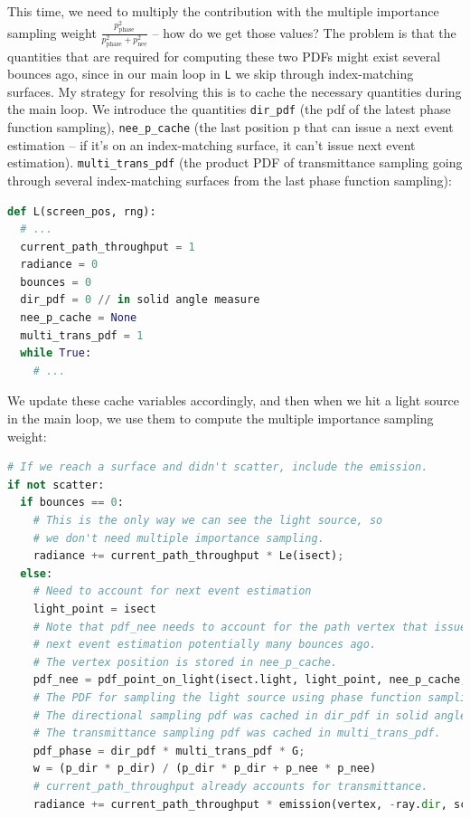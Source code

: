 This time, we need to multiply the contribution with the multiple importance sampling weight $\frac{p_{\text{phase}}^2}{p_{\text{phase}}^2 + p_{\text{nee}}^2}$ -- how do we get those values? The problem is that the quantities that are required for computing these two PDFs might exist several bounces ago, since in our main loop in \lstinline{L} we skip through index-matching surfaces. My strategy for resolving this is to cache the necessary quantities during the main loop. We introduce the quantities \lstinline{dir_pdf} (the pdf of the latest phase function sampling), \lstinline{nee_p_cache} (the last position p that can issue a next event estimation -- if it's on an index-matching surface, it can't issue next event estimation). \lstinline{multi_trans_pdf} (the product PDF of transmittance sampling going through several index-matching surfaces from the last phase function sampling):
\begin{lstlisting}[language=python]
def L(screen_pos, rng):
  # ...
  current_path_throughput = 1
  radiance = 0
  bounces = 0
  dir_pdf = 0 // in solid angle measure
  nee_p_cache = None
  multi_trans_pdf = 1
  while True:
    # ...
\end{lstlisting}

We update these cache variables accordingly, and then when we hit a light source in the main loop, we use them to
compute the multiple importance sampling weight:
\begin{lstlisting}[language=python]
# If we reach a surface and didn't scatter, include the emission.
if not scatter:
  if bounces == 0:
    # This is the only way we can see the light source, so
    # we don't need multiple importance sampling.
    radiance += current_path_throughput * Le(isect);
  else:
    # Need to account for next event estimation
    light_point = isect
    # Note that pdf_nee needs to account for the path vertex that issued
    # next event estimation potentially many bounces ago.
    # The vertex position is stored in nee_p_cache.
    pdf_nee = pdf_point_on_light(isect.light, light_point, nee_p_cache, scene)
    # The PDF for sampling the light source using phase function sampling + transmittance sampling
    # The directional sampling pdf was cached in dir_pdf in solid angle measure.
    # The transmittance sampling pdf was cached in multi_trans_pdf.
    pdf_phase = dir_pdf * multi_trans_pdf * G;
    w = (p_dir * p_dir) / (p_dir * p_dir + p_nee * p_nee)
    # current_path_throughput already accounts for transmittance.
    radiance += current_path_throughput * emission(vertex, -ray.dir, scene) * w
\end{lstlisting}

